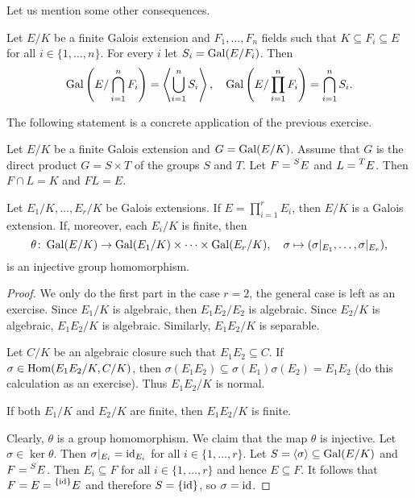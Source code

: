 Let us mention some other consequences.

\begin{exercise}
    Let $E/K$ be a finite Galois extension 
    and $F_1,\dots,F_n$ fields 
    such that $K\subseteq F_i\subseteq E$ for 
    all $i\in\{1,\dots,n\}$. For every 
    $i$ let $S_i=\operatorname{Gal}(E/F_i)$. Then
    \[
    \operatorname{Gal}\left(E/\bigcap_{i=1}^nF_i\right)=\left\langle\bigcup_{i=1}^nS_i\right\rangle,
    \quad
    \operatorname{Gal}\left(E/\prod_{i=1}^nF_i\right)=\bigcap_{i=1}^nS_i.
    \]
\end{exercise}

The following statement is a concrete application of the 
previous exercise.

\begin{exercise}
    Let $E/K$ be a finite Galois extension and $G=\operatorname{Gal}(E/K)$.
    Assume that $G$ is the direct product
    $G=S\times T$
    of the groups $S$ and $T$. Let 
    $F=\prescript{S}{}{E}$ and
    $L=\prescript{T}{}{E}$. Then $F\cap L=K$ and $FL=E$.
\end{exercise}

\begin{proposition}
Let $E_1/K,\dots,E_r/K$ be Galois extensions. 
If $E=\prod_{i=1}^rE_i$, then $E/K$ is a Galois extension. If, moreover, each $E_i/K$ is finite,
then 
\[
\theta\colon \operatorname{Gal}(E/K)\to \operatorname{Gal}(E_1/K)\times\cdots\times\operatorname{Gal}(E_r/K),
\quad
\sigma\mapsto(\sigma|_{E_1},\dots,\sigma|_{E_r}),
\]
is an injective group homomorphism.
\end{proposition}

\begin{proof}
    We only do the first part in the case $r=2$, the general case is left as an exercise. Since $E_1/K$ is algebraic, 
    then $E_1E_2/E_2$ is algebraic. Since $E_2/K$ is algebraic, $E_1E_2/K$ is algebraic. Similarly, 
    $E_1E_2/K$ is separable. 
    
    Let $C/K$ be an algebraic closure such that $E_1E_2\subseteq C$. If $\sigma\in\operatorname{Hom}(E_1E_2/K,C/K)$, then 
    $\sigma(E_1E_2)\subseteq\sigma(E_1)\sigma(E_2)=E_1E_2$ (do this calculation as an exercise). 
    Thus $E_1E_2/K$ is normal. 
    
    If both $E_1/K$ and $E_2/K$ are finite, then $E_1E_2/K$ is finite. 
    
    Clearly, $\theta$ is a group homomorphism. We claim that the map $\theta$ is injective. Let $\sigma\in\ker\theta$. Then
    $\sigma|_{E_i}=\operatorname{id}_{E_i}$ for all $i\in\{1,\dots,r\}$. Let $S=\langle\sigma\rangle\subseteq\operatorname{Gal}(E/K)$ and
    $F=\prescript{S}{}{E}$. Then $E_i\subseteq F$ for all $i\in\{1,\dots,r\}$ and
    hence $E\subseteq F$. It follows that $F=E=\prescript{\{\operatorname{id}\}}{}{E}$ and therefore $S=\{\operatorname{id}\}$, so 
    $\sigma=\operatorname{id}$. 
\end{proof}

